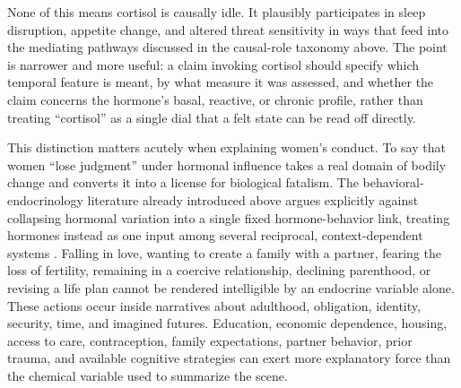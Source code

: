 \documentclass[11pt]{article}
\begin{document}
None of this means cortisol is causally idle. It plausibly participates in sleep disruption, appetite change, and altered threat sensitivity in ways that feed into the mediating pathways discussed in the causal-role taxonomy above. The point is narrower and more useful: a claim invoking cortisol should specify which temporal feature is meant, by what measure it was assessed, and whether the claim concerns the hormone's basal, reactive, or chronic profile, rather than treating ``cortisol'' as a single dial that a felt state can be read off directly.

This distinction matters acutely when explaining women's conduct. To say that women ``lose judgment'' under hormonal influence takes a real domain of bodily change and converts it into a license for biological fatalism. The behavioral-endocrinology literature already introduced above argues explicitly against collapsing hormonal variation into a single fixed hormone-behavior link, treating hormones instead as one input among several reciprocal, context-dependent systems \citep{roney2016frameworks,knack2024behavioral}. Falling in love, wanting to create a family with a partner, fearing the loss of fertility, remaining in a coercive relationship, declining parenthood, or revising a life plan cannot be rendered intelligible by an endocrine variable alone. These actions occur inside narratives about adulthood, obligation, identity, security, time, and imagined futures. Education, economic dependence, housing, access to care, contraception, family expectations, partner behavior, prior trauma, and available cognitive strategies can exert more explanatory force than the chemical variable used to summarize the scene.
\end{document}
